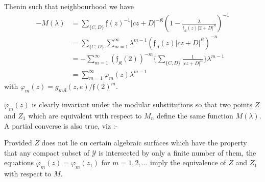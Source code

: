 Then\pageoriginale in such that neighbourhood we have
\begin{align*}
-M (\lambda) &= \sum_{\{ C,D\}} \mathfrak{f} (z)^{-1} |cz + D|^{-\mathfrak{K}}
(1- \frac{\lambda} {\mathfrak{f}_\mathfrak{K} (z) |2+ D|^\mathfrak{K}})^{-1}\\ 
& =  \sum_{\{ C,D\}}  \sum_{m=1}^{\infty} \lambda^{m-1}
(\mathfrak{f}_\mathfrak{K} (z) |cz + D |^\mathfrak{K})^{-n}\\ 
&= - \sum_{m=1}^{\infty} (\mathfrak{f}_\mathfrak{K} (2))^{-m} \{  \sum_{\{ C,D\}}
\frac{1}{|cz + D |^\mathfrak{K}}\}\lambda^{m-1}\\ 
& = \sum_{m=1}^{\infty} \varphi_m (z) \lambda^{m-1}
\end{align*}
with $\varphi _m (z) = g_{m \mathfrak{K}} (z , e) / \mathfrak{f} (2)^m$.

$\varphi _m (z)$ is clearly invariant under the modular substitutions
so that two points $Z$ and $Z_1$ which are equivalent with respect to
$M_n$ define the same function $M(\lambda)$. A partial converse is also
true, viz :- 

\begin{lem}\label{chap12:lem18}%
 Provided $Z$ does not lie on certain algebraic surfaces which
  have the property that any compact subset of $\mathscr{Y}$ is
  intersected by only a finite number of them, the equations $\varphi
  _m (z) = \varphi _m (z_1)$ for $m = 1,2, \ldots $ imply the
  equivalence of $Z$ and $Z_1$ with respect to $M$. 
\end{lem}


